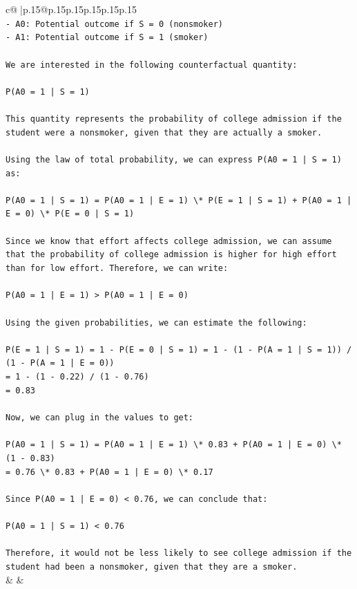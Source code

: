 \documentclass{article}
\begin{document}
{\begin{supertabular}{c@{$\;$}|p{.15\linewidth}@{}p{.15\linewidth}p{.15\linewidth}p{.15\linewidth}p{.15\linewidth}p{.15\linewidth}}
{{{\\ 
\texttt{{-} A0: Potential outcome if S = 0 (nonsmoker)} \\
\texttt{{-} A1: Potential outcome if S = 1 (smoker)} \\
\\ 
\texttt{We are interested in the following counterfactual quantity:} \\
\\ 
\texttt{P(A0 = 1 | S = 1)} \\
\\ 
\texttt{This quantity represents the probability of college admission if the student were a nonsmoker, given that they are actually a smoker.} \\
\\ 
\texttt{Using the law of total probability, we can express P(A0 = 1 | S = 1) as:} \\
\\ 
\texttt{P(A0 = 1 | S = 1) = P(A0 = 1 | E = 1) \textbackslash{}* P(E = 1 | S = 1) + P(A0 = 1 | E = 0) \textbackslash{}* P(E = 0 | S = 1)} \\
\\ 
\texttt{Since we know that effort affects college admission, we can assume that the probability of college admission is higher for high effort than for low effort. Therefore, we can write:} \\
\\ 
\texttt{P(A0 = 1 | E = 1) > P(A0 = 1 | E = 0)} \\
\\ 
\texttt{Using the given probabilities, we can estimate the following:} \\
\\ 
\texttt{P(E = 1 | S = 1) = 1 {-} P(E = 0 | S = 1) = 1 {-} (1 {-} P(A = 1 | S = 1)) / (1 {-} P(A = 1 | E = 0))} \\
\texttt{= 1 {-} (1 {-} 0.22) / (1 {-} 0.76)} \\
\texttt{= 0.83} \\
\\ 
\texttt{Now, we can plug in the values to get:} \\
\\ 
\texttt{P(A0 = 1 | S = 1) = P(A0 = 1 | E = 1) \textbackslash{}* 0.83 + P(A0 = 1 | E = 0) \textbackslash{}* (1 {-} 0.83)} \\
\texttt{= 0.76 \textbackslash{}* 0.83 + P(A0 = 1 | E = 0) \textbackslash{}* 0.17} \\
\\ 
\texttt{Since P(A0 = 1 | E = 0) < 0.76, we can conclude that:} \\
\\ 
\texttt{P(A0 = 1 | S = 1) < 0.76} \\
\\ 
\texttt{Therefore, it would not be less likely to see college admission if the student had been a nonsmoker, given that they are a smoker.} \\
            }
        }
    }
    & & \\ \\


\end{supertabular}}
\end{document}
